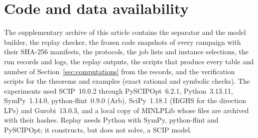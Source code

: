 \section*{Code and data availability}\label{sec:availability}

The supplementary archive of this article contains the separator and the
model builder, the replay checker, the frozen code snapshots of every
campaign with their SHA-256 manifests, the protocols, the job lists and
instance selections, the run records and logs, the replay outputs, the
scripts that produce every table and number of Section~\ref{sec:computations}
from the records, and the verification scripts for the theorems and examples
(exact rational and symbolic checks). The experiments used SCIP~10.0.2
through PySCIPOpt~6.2.1, Python~3.13.11, SymPy~1.14.0, python-flint~0.9.0
(Arb), SciPy~1.18.1 (HiGHS for the direction LPs) and Gurobi~13.0.3, and a
local copy of MINLPLib \citep{BussieckDrudMeeraus2003,Vigerske2026MINLPLib}
whose files are archived with their hashes. Replay needs Python with SymPy,
python-flint and PySCIPOpt; it constructs, but does not solve, a SCIP model.
